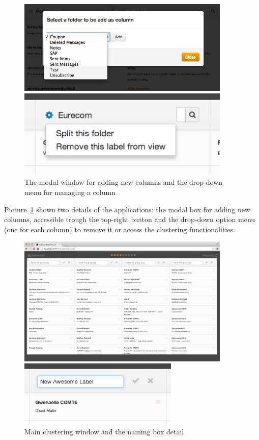\documentclass[a4paper,12pt]{report}
\begin{document}
\begin{figure}[H]
  \centering
  \includegraphics[width=4in]{main_modal_detail}
  
  \vspace{0.2in}

  \includegraphics[width=4in]{main_options}
  \caption{The modal window for adding new columns and the drop-down menu for managing a column}
  \label{fig:main_modal}
\end{figure}
Picture~\ref{fig:main_modal} shown two details of the applications: the modal box for adding new columns, accessible trough the top-right button and the drop-down option menu (one for each column) to remove it or access the clustering functionalities.

\begin{figure}[H]
  \centering
  \includegraphics[width=4in]{clusters}
  
  \vspace{0.2in}

  \includegraphics[width=3in]{clusters_detail}
  \caption{Main clustering window and the naming box detail}
  \label{fig:cluster}
\end{figure}
\end{document}
